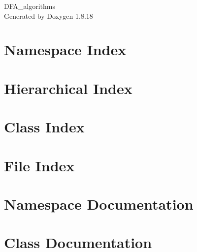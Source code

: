 \let\mypdfximage\pdfximage\def\pdfximage{\immediate\mypdfximage}\documentclass[twoside]{book}
\newcommand{\+}{\discretionary{\mbox{\scriptsize$\hookleftarrow$}}{}{}}
\newcommand{\clearemptydoublepage}{%
  \newpage{\pagestyle{empty}\cleardoublepage}%
}
\begin{document}
\hypersetup{pageanchor=false,
             bookmarksnumbered=true,
             pdfencoding=unicode
            }
\begin{titlepage}
\vspace*{7cm}
\begin{center}%
{\Large D\+F\+A\+\_\+algorithms }\\
\vspace*{1cm}
{\large Generated by Doxygen 1.8.18}\\
\end{center}
\end{titlepage}
\clearemptydoublepage
{}
\tableofcontents
\clearemptydoublepage
{}
\hypersetup{pageanchor=true}

\chapter{Namespace Index}

\chapter{Hierarchical Index}

\chapter{Class Index}

\chapter{File Index}

\chapter{Namespace Documentation}















\chapter{Class Documentation}

















\end{document}
